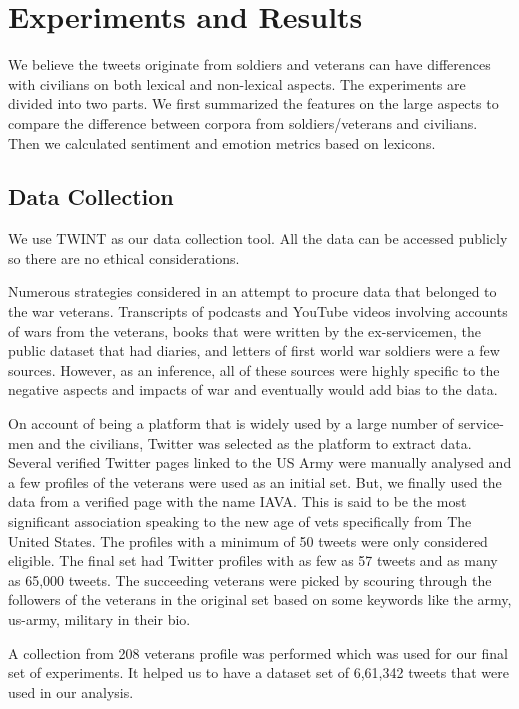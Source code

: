 \section{Experiments and Results}

We believe the tweets originate from soldiers and veterans can have differences with civilians on both lexical and non-lexical aspects. The experiments are divided into two parts. We first summarized the features on the large aspects to compare the difference between corpora from soldiers/veterans and civilians. Then we calculated sentiment and emotion metrics based on lexicons.

\subsection{Data Collection}

We use TWINT \citep{twint} as our data collection tool. All the data can be accessed publicly so there are no ethical considerations.

Numerous strategies considered in an attempt to procure data that belonged to the war veterans. Transcripts of podcasts and YouTube videos involving accounts of wars from the veterans, books that were written by the ex-servicemen, the public dataset that had diaries, and letters of first world war soldiers were a few sources. However, as an inference, all of these sources were highly specific to the negative aspects and impacts of war and eventually would add bias to the data.

On account of being a platform that is widely used by a large number of service-men and the civilians, Twitter was selected as the platform to extract data. Several verified Twitter pages linked to the US Army were manually analysed and a few profiles of the veterans were used as an initial set. But, we finally used the data from a verified page with the name IAVA. This is said to be the most significant association speaking to the new age of vets specifically from The United States. The profiles with a minimum of 50 tweets were only considered eligible. The final set had Twitter profiles with as few as 57 tweets and as many as 65,000 tweets. The succeeding veterans were picked by scouring through the followers of the veterans in the original set based on some keywords like the army, us-army, military in their bio.

A collection from 208 veterans profile was performed which was used for our final set of experiments. It helped us to have a dataset set of 6,61,342 tweets that were used in our analysis.

